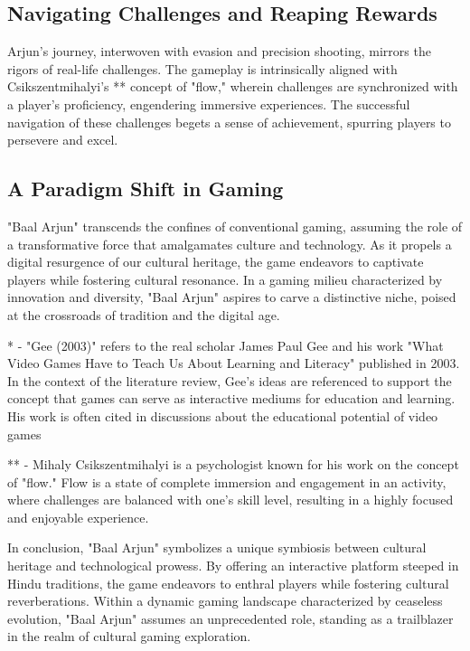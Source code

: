 \subsection{Navigating Challenges and Reaping Rewards}
Arjun's journey, interwoven with evasion and precision shooting, mirrors the rigors of real-life challenges. The gameplay is intrinsically aligned with Csikszentmihalyi's ** concept of "flow," wherein challenges are synchronized with a player's proficiency, engendering immersive experiences. The successful navigation of these challenges begets a sense of achievement, spurring players to persevere and excel.

\subsection{A Paradigm Shift in Gaming}
"Baal Arjun" transcends the confines of conventional gaming, assuming the role of a transformative force that amalgamates culture and technology. As it propels a digital resurgence of our cultural heritage, the game endeavors to captivate players while fostering cultural resonance. In a gaming milieu characterized by innovation and diversity, "Baal Arjun" aspires to carve a distinctive niche, poised at the crossroads of tradition and the digital age.

* - "Gee (2003)" refers to the real scholar James Paul Gee and his work "What Video Games Have to Teach Us About Learning and Literacy" published in 2003. In the context of the literature review, Gee's ideas are referenced to support the concept that games can serve as interactive mediums for education and learning. His work is often cited in discussions about the educational potential of video games

** - Mihaly Csikszentmihalyi is a psychologist known for his work on the concept of "flow." Flow is a state of complete immersion and engagement in an activity, where challenges are balanced with one's skill level, resulting in a highly focused and enjoyable experience. 

In conclusion, "Baal Arjun" symbolizes a unique symbiosis between cultural heritage and technological prowess. By offering an interactive platform steeped in Hindu traditions, the game endeavors to enthral players while fostering cultural reverberations. Within a dynamic gaming landscape characterized by ceaseless evolution, "Baal Arjun" assumes an unprecedented role, standing as a trailblazer in the realm of cultural gaming exploration.



\newpage